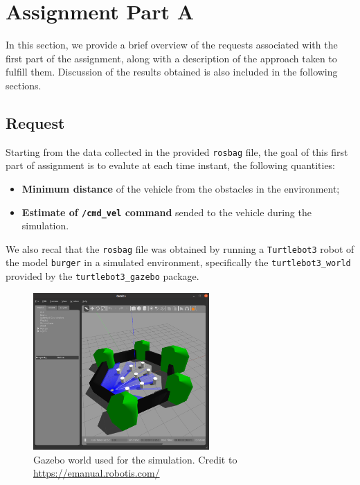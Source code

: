\section{Assignment Part A}
\label{sec:assignment_part_A}

In this section, we provide a brief overview of the requests associated with the first part of the assignment, along with a description of the approach taken to fulfill them.
Discussion of the results obtained is also included in the following sections.



\subsection{Request}
\label{subsec:request_part_A}

Starting from the data collected in the provided \texttt{rosbag} file, the goal of this first part of assignment is to evalute at each time instant, the following quantities:

\begin{itemize}
    \item \textbf{Minimum distance} of the vehicle from the obstacles in the environment;
    \item \textbf{Estimate of \texttt{/cmd\_vel} command} sended to the vehicle during the simulation.
\end{itemize}

We also recal that the \texttt{rosbag} file was obtained by running a \texttt{Turtlebot3} robot of the model \texttt{burger} in a simulated environment, specifically the \texttt{turtlebot3\_world} provided by the \texttt{turtlebot3\_gazebo} package.

\begin{figure}[H]
    \centering
    \includegraphics[width=0.6\textwidth]{./img/gazebo_world.png}
    \caption{Gazebo world used for the simulation. Credit to \url{https://emanual.robotis.com/}}
    \label{fig:turtlebot3_world}
\end{figure}




